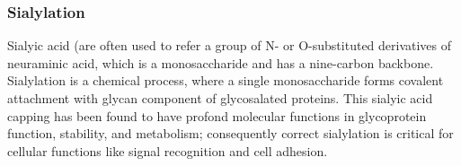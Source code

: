 \subsubsection {Sialylation}
Sialyic acid (are often used to refer a group of N- or O-substituted derivatives of neuraminic acid, which is a monosaccharide and has a nine-carbon backbone.~\cite{Vocadlo_2009} Sialylation is a chemical process, where a single monosaccharide forms covalent attachment with glycan component of glycosalated proteins. This sialyic acid capping has been found to have profond molecular functions in glycoprotein function, stability, and metabolism; consequently correct sialylation is critical for cellular functions like signal recognition and cell adhesion.~\cite{Bhide_2016}
